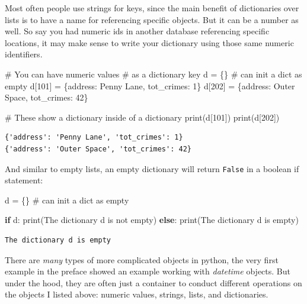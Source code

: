 \documentclass[
  letterpaper,
]{scrbook}
\newenvironment{Shaded}{\begin{snugshade}}{\end{snugshade}}
\newcommand{\BuiltInTok}[1]{\textcolor[rgb]{0.00,0.23,0.31}{#1}}
\newcommand{\CommentTok}[1]{\textcolor[rgb]{0.37,0.37,0.37}{#1}}
\newcommand{\ControlFlowTok}[1]{\textcolor[rgb]{0.00,0.23,0.31}{\textbf{#1}}}
\newcommand{\DecValTok}[1]{\textcolor[rgb]{0.68,0.00,0.00}{#1}}
\newcommand{\NormalTok}[1]{\textcolor[rgb]{0.00,0.23,0.31}{#1}}
\newcommand{\OperatorTok}[1]{\textcolor[rgb]{0.37,0.37,0.37}{#1}}
\newcommand{\StringTok}[1]{\textcolor[rgb]{0.13,0.47,0.30}{#1}}
\begin{document}
Most often people use strings for keys, since the main benefit of
dictionaries over lists is to have a name for referencing specific
objects. But it can be a number as well. So say you had numeric ids in
another database referencing specific locations, it may make sense to
write your dictionary using those same numeric identifiers.

\begin{Shaded}
\begin{Highlighting}[]
\CommentTok{\# You can have numeric values}
\CommentTok{\# as a dictionary key}
\NormalTok{d }\OperatorTok{=}\NormalTok{ \{\} }\CommentTok{\# can init a dict as empty}
\NormalTok{d[}\DecValTok{101}\NormalTok{] }\OperatorTok{=}\NormalTok{ \{}\StringTok{\textquotesingle{}address\textquotesingle{}}\NormalTok{: }\StringTok{\textquotesingle{}Penny Lane\textquotesingle{}}\NormalTok{, }\StringTok{\textquotesingle{}tot\_crimes\textquotesingle{}}\NormalTok{: }\DecValTok{1}\NormalTok{\}}
\NormalTok{d[}\DecValTok{202}\NormalTok{] }\OperatorTok{=}\NormalTok{ \{}\StringTok{\textquotesingle{}address\textquotesingle{}}\NormalTok{: }\StringTok{\textquotesingle{}Outer Space\textquotesingle{}}\NormalTok{, }\StringTok{\textquotesingle{}tot\_crimes\textquotesingle{}}\NormalTok{: }\DecValTok{42}\NormalTok{\}}

\CommentTok{\# These show a dictionary inside of a dictionary}
\BuiltInTok{print}\NormalTok{(d[}\DecValTok{101}\NormalTok{])}
\BuiltInTok{print}\NormalTok{(d[}\DecValTok{202}\NormalTok{])}
\end{Highlighting}
\end{Shaded}

\begin{verbatim}
{'address': 'Penny Lane', 'tot_crimes': 1}
{'address': 'Outer Space', 'tot_crimes': 42}
\end{verbatim}

And similar to empty lists, an empty dictionary will return
\texttt{False} in a boolean if statement:

\begin{Shaded}
\begin{Highlighting}[]
\NormalTok{d }\OperatorTok{=}\NormalTok{ \{\} }\CommentTok{\# can init a dict as empty}

\ControlFlowTok{if}\NormalTok{ d:}
  \BuiltInTok{print}\NormalTok{(}\StringTok{\textquotesingle{}The dictionary d is not empty\textquotesingle{}}\NormalTok{)}
\ControlFlowTok{else}\NormalTok{:}
  \BuiltInTok{print}\NormalTok{(}\StringTok{\textquotesingle{}The dictionary d is empty\textquotesingle{}}\NormalTok{)}
\end{Highlighting}
\end{Shaded}

\begin{verbatim}
The dictionary d is empty
\end{verbatim}

There are \emph{many} types of more complicated objects in python, the
very first example in the preface showed an example working with
\emph{datetime} objects. But under the hood, they are often just a
container to conduct different operations on the objects I listed above:
numeric values, strings, lists, and dictionaries.


\backmatter
\end{document}
